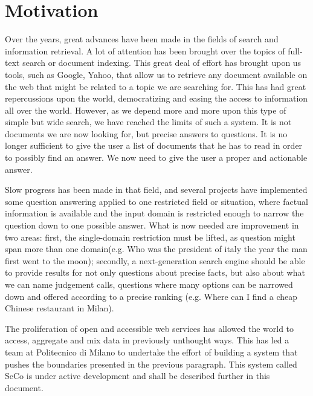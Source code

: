 \chapter{Motivation} %
\label{cha:motivation}

Over the years, great advances have been made in the fields of search and information retrieval. A lot of attention has been brought over the topics of full-text search or document indexing. This great deal of effort has brought upon us tools, such as Google, Yahoo, that allow us to retrieve any document available on the web that might be related to a topic we are searching for. This has had great repercussions upon the world, democratizing and easing the access to information all over the world. However, as we depend more and more upon this type of simple but wide search, we have reached the limits of such a system. It is not documents we are now looking for, but precise answers to questions. It is no longer sufficient to give the user a list of documents that he has to read in order to possibly find an answer. We now need to give the user a proper and actionable answer.

Slow progress has been made in that field, and several projects have implemented some question answering applied to one restricted field or situation, where factual information is available and the input domain is restricted enough to narrow the question down to one possible answer. What is now needed are improvement in two areas: first, the single-domain restriction must be lifted, as question might span more than one domain(e.g. Who was the president of italy the year the man first went to the moon); secondly, a next-generation search engine should be able to provide results for not only questions about precise facts, but also about what we can name judgement calls, questions where many options can be narrowed down and offered according to a precise ranking (e.g. Where can I find a cheap Chinese restaurant in Milan).

The proliferation of open and accessible web services has allowed the world to access, aggregate and mix data in previously unthought ways. This has led a team at Politecnico di Milano to undertake the effort of building a system that pushes the boundaries presented in the previous paragraph. This system called SeCo is under active development and shall be described further in this document.

